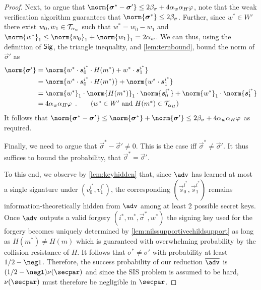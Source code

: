 \begin{proof}
  Next, to argue that $\norm{\vec{\sigma}^*-\vec{\sigma}'}\leq 2\beta_\sigma + 4\alpha_w\alpha_H\varphi$, note that the weak verification algorithm guarantees that $\norm{\vec{\sigma}^*} \leq 2\beta_\sigma$.
  Further, since $w^*\in W'$ there exist $w_0,w_1 \in \mathcal{T}_{\alpha_w}$ such that $w^* = w_0-w_1$ and $\norm{w^*}_1 \leq \norm{w_0}_1 + \norm{w_1}_1 = 2\alpha_w$.
  We can thus, using the definition of $\mathsf{Sig}$, the triangle inequality, and \autoref{lem:ternbound}, bound the norm of $\vec{\sigma}'$ as
  \begin{align*}
    \norm{\vec{\sigma}'} ={}& \norm{w^*\cdot\vec{s}^{i^*}_0\cdot H(m^*)+ w^*\cdot\vec{s}^{i^*}_1}\\
    ={}&\norm{w^*\cdot\vec{s}^{i^*}_0\cdot H(m^*)}+ \norm{w^*\cdot\vec{s}^{i^*}_1}\\
    ={}&\norm{w^*}_1\cdot\norm{H(m^*)}_1\cdot\norm{\vec{s}^{i^*}_0} + \norm{w^*}_1\cdot\norm{\vec{s}^{i^*}_1}\\
    ={}&4\alpha_w\alpha_H\varphi\enspace.\tag{$w^*\in W'$ and $H(m^*)\in\tern_{\alpha_H}$}
  \end{align*}
  It follows that $\norm{\vec{\sigma}^*-\vec{\sigma}'} \leq \norm{\vec{\sigma}^*}+\norm{\vec{\sigma}'} \leq 2\beta_\sigma + 4\alpha_w\alpha_H\varphi$ as required.

  Finally, we need to argue that $\vec{\sigma}^*-\vec{\sigma}'\neq 0$.
  This is the case iff $\vec{\sigma}^* \neq \vec{\sigma}'$.
  It thus suffices to bound the probability, that $\vec{\sigma}^*=\vec{\sigma}'$.

  To this end, we observe by \autoref{lem:keyhidden} that, since $\adv$ has learned at most a single signature under $(v_0^{i^*},v_1^{i^*})$, the corresponding $(\vec{s}_0^{i^*},\vec{s}_1^{i^*})$ remains information-theoretically hidden from $\adv$ among at least 2 possible secret keys.
  Once $\adv$ outputs a valid forgery $(i^*,m^*,\vec{\sigma}^*,w^*)$ the signing key used for the forgery becomes uniquely determined by \autoref{lem:nilssupportivechildsupport} as long as $H(m^*)\neq H(m)$ which is guaranteed with overwhelming probability by the collision resistance of $H$.
  It follows that $\sigma^* \neq \sigma'$ with probability at least $1/2 - \negl$.
  Therefore, the success probability of our reduction $\sisadvkots$ is $(1/2 - \negl) \nu(\secpar)$ and since the SIS problem is assumed to be hard, $\nu(\secpar)$ must therefore be negligible in $\secpar$.
\end{proof}

